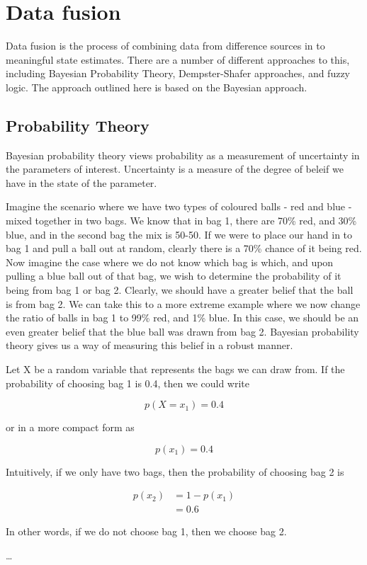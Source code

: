 \section{Data fusion}

Data fusion is the process of combining data from difference sources in to meaningful state estimates. 
There are a number of different approaches to this, including Bayesian Probability Theory, Dempster-Shafer approaches, and fuzzy logic. 
The approach outlined here is based on the Bayesian approach.

\subsection{Probability Theory}

Bayesian probability theory views  probability as a measurement of uncertainty in the parameters of interest. 
Uncertainty is a measure of the degree of beleif we have in the state of the parameter. 

Imagine the scenario where we have two types of coloured balls - red and blue - mixed together in two bags.
 We know that in bag 1, there are 70\% red, and 30\% blue, and in the second bag the mix is 50-50. 
 If we were to place our hand in to bag 1 and pull a ball out at random, clearly there is a 70\% chance of it being red. 
 Now imagine the case where we do not know which bag is which, and upon pulling a blue ball out of that bag, we wish to determine the probability of it being from bag 1 or bag 2. 
 Clearly, we should have a greater belief that the ball is from bag 2. We can take this to a more extreme example where we now change the ratio of balls in bag 1 to 99\% red, and 1\% blue. 
 In this case, we should be an even greater belief that the blue ball was drawn from bag 2. Bayesian probability theory gives us a way of measuring this belief in a robust manner. 

Let X be a random variable that represents the bags we can draw from. If the probability of choosing bag 1 is 0.4, then we could write

\begin{equation}
p(X=x_1)=0.4
\end{equation}

or in a more compact form as 

\begin{equation}
p(x_1)=0.4
\end{equation}

Intuitively, if we only have two bags, then the probability of choosing bag 2 is 

\begin{align}
p(x_2)&=1-p(x_1)\\ 
	  &= 0.6
\end{align}

In other words, if we do not choose bag 1, then we choose bag 2. 

\dots
